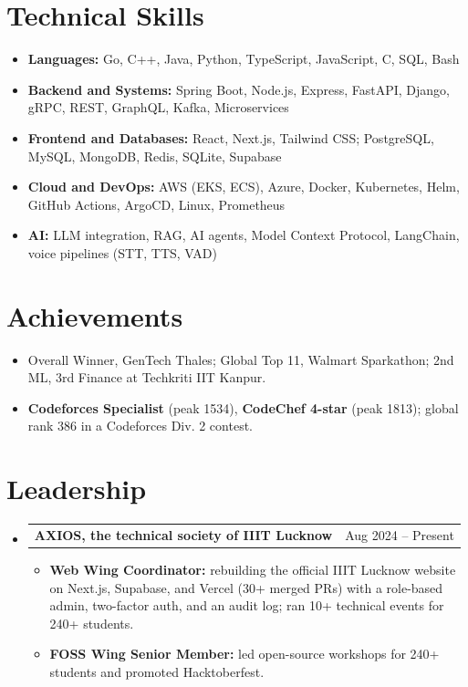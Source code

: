 \documentclass[a4paper,10pt]{article}
\makeatletter
\newcommand{\role}[2]{%
  \item\begin{tabular*}{0.98\textwidth}[t]{l@{\extracolsep{\fill}}r}
    \textbf{#1} & \small #2 \\
  \end{tabular*}\vspace{-6pt}}
\newenvironment{entries}{\begin{itemize}[leftmargin=0.12in,label={},itemsep=1pt,topsep=1pt]}{\end{itemize}}
\newenvironment{points}{\begin{itemize}[leftmargin=0.2in,itemsep=0pt,topsep=1pt,parsep=0pt,label={\tiny$\bullet$}]\small}{\end{itemize}\vspace{-3pt}}
\makeatother
\begin{document}
\section{Technical Skills}
\begin{points}
  \item[] \textbf{Languages:} Go, C++, Java, Python, TypeScript, JavaScript, C, SQL, Bash
  \item[] \textbf{Backend and Systems:} Spring Boot, Node.js, Express, FastAPI, Django, gRPC, REST, GraphQL, Kafka, Microservices
  \item[] \textbf{Frontend and Databases:} React, Next.js, Tailwind CSS; PostgreSQL, MySQL, MongoDB, Redis, SQLite, Supabase
  \item[] \textbf{Cloud and DevOps:} AWS (EKS, ECS), Azure, Docker, Kubernetes, Helm, GitHub Actions, ArgoCD, Linux, Prometheus
  \item[] \textbf{AI:} LLM integration, RAG, AI agents, Model Context Protocol, LangChain, voice pipelines (STT, TTS, VAD)
\end{points}

\section{Achievements}
\begin{points}
  \item Overall Winner, GenTech Thales; Global Top 11, Walmart Sparkathon; 2nd ML, 3rd Finance at Techkriti IIT Kanpur.
  \item \textbf{Codeforces Specialist} (peak 1534), \textbf{CodeChef 4-star} (peak 1813); global rank 386 in a Codeforces Div. 2 contest.
\end{points}

\section{Leadership}
\begin{entries}
  \role{AXIOS, the technical society of IIIT Lucknow}{Aug 2024 -- Present}
  \begin{points}
    \item \textbf{Web Wing Coordinator:} rebuilding the official IIIT Lucknow website on Next.js, Supabase, and Vercel (30+ merged PRs) with a role-based admin, two-factor auth, and an audit log; ran 10+ technical events for 240+ students.
    \item \textbf{FOSS Wing Senior Member:} led open-source workshops for 240+ students and promoted Hacktoberfest.
  \end{points}
\end{entries}
\end{document}
